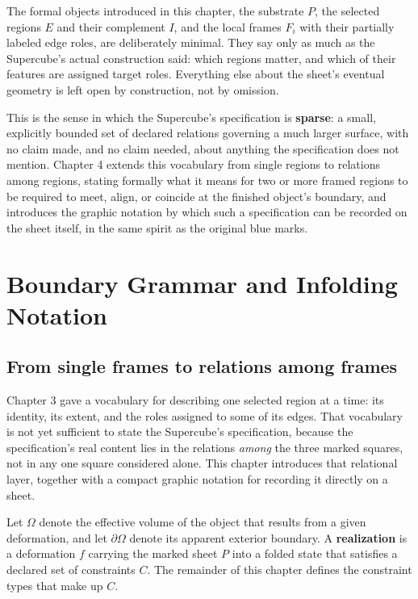 \documentclass[11pt,oneside]{book}
\begin{document}
The formal objects introduced in this chapter, the substrate \(P\), the
selected regions \(E\) and their complement \(I\), and the local frames
\(F_i\) with their partially labeled edge roles, are deliberately
minimal. They say only as much as the Supercube's actual construction
said: which regions matter, and which of their features are assigned
target roles. Everything else about the sheet's eventual geometry is
left open by construction, not by omission.

This is the sense in which the Supercube's specification is
\textbf{sparse}: a small, explicitly bounded set of declared relations
governing a much larger surface, with no claim made, and no claim
needed, about anything the specification does not mention. Chapter 4
extends this vocabulary from single regions to relations among regions,
stating formally what it means for two or more framed regions to be
required to meet, align, or coincide at the finished object's boundary,
and introduces the graphic notation by which such a specification can be
recorded on the sheet itself, in the same spirit as the original blue
marks.

\hypertarget{chapter-4.-boundary-grammar-and-infolding-notation}{%
\chapter{Boundary Grammar and Infolding
Notation}\label{chapter-4.-boundary-grammar-and-infolding-notation}}

\hypertarget{from-single-frames-to-relations-among-frames}{%
\section{From single frames to relations among
frames}\label{from-single-frames-to-relations-among-frames}}

Chapter 3 gave a vocabulary for describing one selected region at a
time: its identity, its extent, and the roles assigned to some of its
edges. That vocabulary is not yet sufficient to state the Supercube's
specification, because the specification's real content lies in the
relations \emph{among} the three marked squares, not in any one square
considered alone. This chapter introduces that relational layer,
together with a compact graphic notation for recording it directly on a
sheet.

Let \(\Omega\) denote the effective volume of the object that results
from a given deformation, and let \(\partial\Omega\) denote its apparent
exterior boundary. A \textbf{realization} is a deformation \(f\)
carrying the marked sheet \(P\) into a folded state that satisfies a
declared set of constraints \(C\). The remainder of this chapter defines
the constraint types that make up \(C\).
\end{document}
